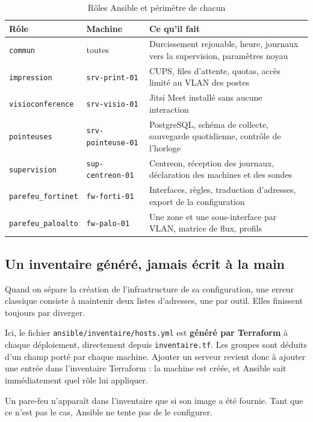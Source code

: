 \documentclass[11pt,a4paper]{article}
\newcommand{\ttb}[1]{\texttt{\small #1}}
\begin{document}
\begin{table}[H]
\centering
\caption{Rôles Ansible et périmètre de chacun}
\begin{tabularx}{\textwidth}{L{3.4cm} L{3.4cm} Y}
\toprule
{}\textbf{Rôle} & \textbf{Machine} & \textbf{Ce qu'il fait} \\
\midrule
\ttb{commun} & toutes & Durcissement rejouable, heure, journaux vers la supervision, paramètres noyau \\
\ttb{impression} & \ttb{srv-print-01} & CUPS, files d'attente, quotas, accès limité au VLAN des postes \\
\ttb{visioconference} & \ttb{srv-visio-01} & Jitsi Meet installé sans aucune interaction \\
\ttb{pointeuses} & \ttb{srv-pointeuse-01} & PostgreSQL, schéma de collecte, sauvegarde quotidienne, contrôle de l'horloge \\
\ttb{supervision} & \ttb{sup-centreon-01} & Centreon, réception des journaux, déclaration des machines et des sondes \\
\ttb{parefeu\_fortinet} & \ttb{fw-forti-01} & Interfaces, règles, traduction d'adresses, export de la configuration \\
\ttb{parefeu\_paloalto} & \ttb{fw-palo-01} & Une zone et une sous-interface par VLAN, matrice de flux, profils \\
\bottomrule
\end{tabularx}
\end{table}

\subsection{Un inventaire généré, jamais écrit à la main}

Quand on sépare la création de l'infrastructure de sa configuration, une erreur
classique consiste à maintenir deux listes d'adresses, une par outil. Elles
finissent toujours par diverger.

Ici, le fichier \ttb{ansible/inventaire/hosts.yml} est \textbf{généré par
Terraform} à chaque déploiement, directement depuis \ttb{inventaire.tf}. Les
groupes sont déduits d'un champ porté par chaque machine. Ajouter un serveur
revient donc à ajouter une entrée dans l'inventaire Terraform : la machine est
créée, et Ansible sait immédiatement quel rôle lui appliquer.

Un pare-feu n'apparaît dans l'inventaire que si son image a été fournie. Tant
que ce n'est pas le cas, Ansible ne tente pas de le configurer.
\end{document}
